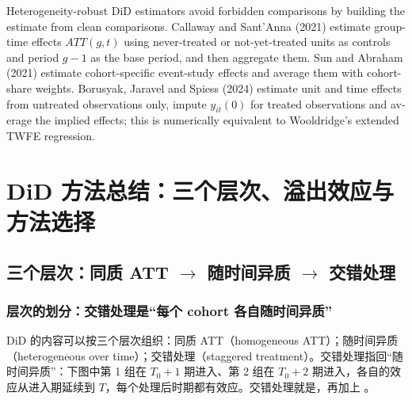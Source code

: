 \begin{english}
Heterogeneity-robust DiD estimators avoid forbidden comparisons by building the estimate from clean comparisons. Callaway and Sant'Anna (2021) estimate group-time effects $ATT(g,t)$ using never-treated or not-yet-treated units as controls and period $g-1$ as the base period, and then aggregate them. Sun and Abraham (2021) estimate cohort-specific event-study effects and average them with cohort-share weights. Borusyak, Jaravel and Spiess (2024) estimate unit and time effects from untreated observations only, impute $y_{it}(0)$ for treated observations and average the implied effects; this is numerically equivalent to Wooldridge's extended TWFE regression.
\end{english}

\section{DiD 方法总结：三个层次、溢出效应与方法选择}\label{sec:U15b-wrap}

\subsection{三个层次：同质 ATT \texorpdfstring{$\to$}{->} 随时间异质 \texorpdfstring{$\to$}{->} 交错处理}

\subsubsection{层次的划分：交错处理是“每个 cohort 各自随时间异质”}

DiD 的内容可以按三个层次组织：同质 ATT（homogeneous ATT）；随时间异质（heterogeneous over time）；交错处理（staggered treatment）。交错处理指回“随时间异质”：下图中第 1 组在 $T_0+1$ 期进入、第 2 组在 $T_0+2$ 期进入，各自的效应从进入期延续到 $T$，每个处理后时期都有效应。交错处理就是，再加上 。

\begin{center}
\end{center}

